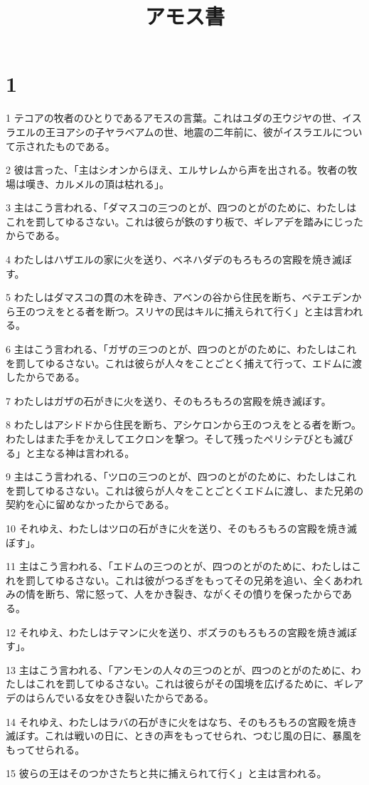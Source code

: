 

\title{アモス書}


\chapter{1}

\par 1 テコアの牧者のひとりであるアモスの言葉。これはユダの王ウジヤの世、イスラエルの王ヨアシの子ヤラベアムの世、地震の二年前に、彼がイスラエルについて示されたものである。
\par 2 彼は言った、「主はシオンからほえ、エルサレムから声を出される。牧者の牧場は嘆き、カルメルの頂は枯れる」。
\par 3 主はこう言われる、「ダマスコの三つのとが、四つのとがのために、わたしはこれを罰してゆるさない。これは彼らが鉄のすり板で、ギレアデを踏みにじったからである。
\par 4 わたしはハザエルの家に火を送り、ベネハダデのもろもろの宮殿を焼き滅ぼす。
\par 5 わたしはダマスコの貫の木を砕き、アベンの谷から住民を断ち、ベテエデンから王のつえをとる者を断つ。スリヤの民はキルに捕えられて行く」と主は言われる。
\par 6 主はこう言われる、「ガザの三つのとが、四つのとがのために、わたしはこれを罰してゆるさない。これは彼らが人々をことごとく捕えて行って、エドムに渡したからである。
\par 7 わたしはガザの石がきに火を送り、そのもろもろの宮殿を焼き滅ぼす。
\par 8 わたしはアシドドから住民を断ち、アシケロンから王のつえをとる者を断つ。わたしはまた手をかえしてエクロンを撃つ。そして残ったペリシテびとも滅びる」と主なる神は言われる。
\par 9 主はこう言われる、「ツロの三つのとが、四つのとがのために、わたしはこれを罰してゆるさない。これは彼らが人々をことごとくエドムに渡し、また兄弟の契約を心に留めなかったからである。
\par 10 それゆえ、わたしはツロの石がきに火を送り、そのもろもろの宮殿を焼き滅ぼす」。
\par 11 主はこう言われる、「エドムの三つのとが、四つのとがのために、わたしはこれを罰してゆるさない。これは彼がつるぎをもってその兄弟を追い、全くあわれみの情を断ち、常に怒って、人をかき裂き、ながくその憤りを保ったからである。
\par 12 それゆえ、わたしはテマンに火を送り、ボズラのもろもろの宮殿を焼き滅ぼす」。
\par 13 主はこう言われる、「アンモンの人々の三つのとが、四つのとがのために、わたしはこれを罰してゆるさない。これは彼らがその国境を広げるために、ギレアデのはらんでいる女をひき裂いたからである。
\par 14 それゆえ、わたしはラバの石がきに火をはなち、そのもろもろの宮殿を焼き滅ぼす。これは戦いの日に、ときの声をもってせられ、つむじ風の日に、暴風をもってせられる。
\par 15 彼らの王はそのつかさたちと共に捕えられて行く」と主は言われる。


